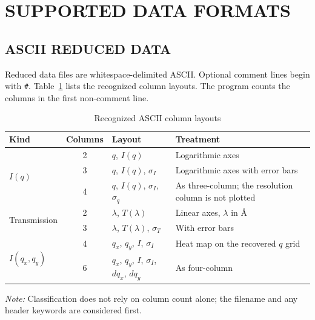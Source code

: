\documentclass[tm]{ornltm}
\begin{document}
\section{SUPPORTED DATA FORMATS}
\label{sec:formats}

\subsection{ASCII REDUCED DATA}

Reduced data files are whitespace-delimited ASCII. Optional comment lines begin
with \texttt{\#}. Table~\ref{tab:formats} lists the recognized column layouts.
The program counts the columns in the first non-comment line.

\begin{table}[ht]
  \centering
  \begin{threeparttable}
  \caption{Recognized ASCII column layouts}
  \label{tab:formats}
  \small
  \begin{tabular}{l c l p{}}
    \toprule
    Kind & Columns & Layout & Treatment \\
    \midrule
    \multirow{3}{*}{$I(q)$}
      & 2 & $q$, $I(q)$ & Logarithmic axes \\
      & 3 & $q$, $I(q)$, $\sigma_I$ & Logarithmic axes with error bars \\
      & 4 & $q$, $I(q)$, $\sigma_I$, $\sigma_q$ & As three-column; the
        resolution column is not plotted \\
    \midrule
    \multirow{2}{*}{Transmission}
      & 2 & $\lambda$, $T(\lambda)$ & Linear axes, $\lambda$ in \AA \\
      & 3 & $\lambda$, $T(\lambda)$, $\sigma_T$ & With error bars \\
    \midrule
    \multirow{2}{*}{$I(q_x,q_y)$}
      & 4 & $q_x$, $q_y$, $I$, $\sigma_I$ & Heat map on the recovered
        $q$ grid \\
      & 6 & $q_x$, $q_y$, $I$, $\sigma_I$, $dq_x$, $dq_y$ & As four-column \\
    \bottomrule
  \end{tabular}
  \begin{tablenotes}
    \item \emph{Note:} Classification does not rely on column count alone; the
    filename and any header keywords are considered first.
  \end{tablenotes}
  \end{threeparttable}
\end{table}
\end{document}

